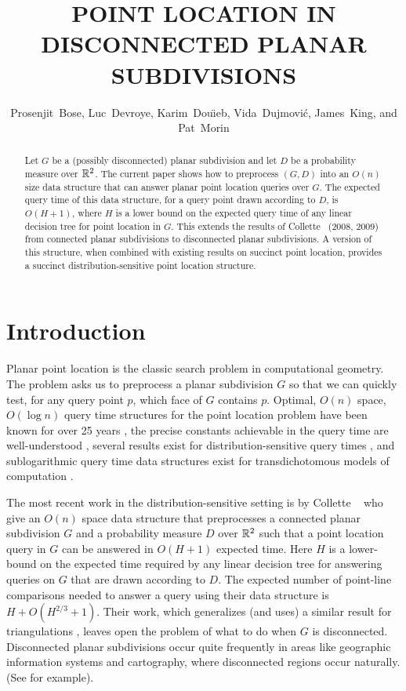 \documentclass{patmorin}
\title{\MakeUppercase{Point Location in Disconnected Planar Subdivisions}}
\author{Prosenjit~Bose, 
        Luc~Devroye,
	Karim~Dou\"{\i}eb, 
	Vida~Dujmovi\'c, 
	James~King, and 
	Pat~Morin}
\begin{document}
\maketitle

\begin{abstract}
Let $G$ be a (possibly disconnected) planar subdivision and let $D$
be a probability measure over $\mathbb{R}^2$.  The current paper shows how to
preprocess $(G,D)$ into an $O(n)$ size data structure that can answer
planar point location queries over $G$.  The expected query time of this
data structure, for a query point drawn according to $D$, is $O(H+1)$,
where $H$ is a lower bound on the expected query time of any linear
decision tree for point location in $G$.  This extends the results
of Collette \etal\ (2008, 2009) from connected planar subdivisions to
disconnected planar subdivisions.  A version of this structure, when
combined with existing results on succinct point location, provides a
succinct distribution-sensitive point location structure.
\end{abstract}

\section{Introduction}

Planar point location is the classic search problem in computational
geometry.  The problem asks us to preprocess a planar subdivision
$G$ so that we can quickly test, for any query point $p$, which
face of $G$ contains $p$.  Optimal, $O(n)$ space, $O(\log n)$ query
time structures for the point location problem have been known for
over 25 years \cite{egs86,k83,m90,st86}, the precise constants
achievable in the query time are well-understood \cite{as98},
several results exist for distribution-sensitive query times
\cite{acmr00,amm00,amm01a,amm01b,ammw07,cdilm08,cdilm09,i01,i04}, and
sublogarithmic query time data structures exist for transdichotomous
models of computation \cite{c06,cp09,p06}.

The most recent work in the distribution-sensitive setting is by
Collette \etal\ \cite{cdilm08} who give an $O(n)$ space data structure
that preprocesses a connected planar subdivision $G$ and a probability
measure $D$ over $\mathbb{R}^2$ such that a point location query in $G$ can be
answered in $O(H+1)$ expected time.  Here $H$ is a lower-bound on the
expected time required by any linear decision tree for answering queries
on $G$ that are drawn according to $D$.  The expected number of point-line
comparisons needed to answer a query using their data structure is $H +
O(H^{2/3}+1)$.  Their work, which generalizes (and uses) a similar result
for triangulations \cite{ammw07}, leaves open the problem of what to do
when $G$ is disconnected. Disconnected planar subdivisions occur quite
frequently in areas like geographic information systems and cartography,
where disconnected regions occur naturally. (See 
for example).
\end{document}
